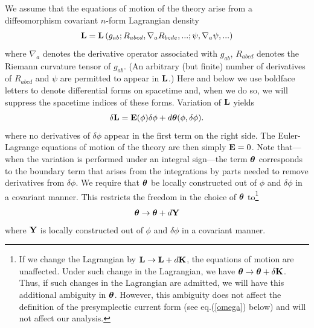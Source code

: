 We assume that the equations of motion of the theory arise from a
diffeomorphism covariant $n$-form Lagrangian density \cite{iw}
\begin{equation}
{\bf L} = {\bf L} \left( g_{ab}; R_{abcd}, \nabla_a R_{bcde},
...;\psi, \nabla_a \psi, ...\right)
\label{lag}
\end{equation}
where $\nabla_a$ denotes the derivative operator associated with
$g_{ab}$, $R_{abcd}$ denotes the Riemann curvature tensor of
$g_{ab}$. (An arbitrary (but finite) number of derivatives of
$R_{abcd}$ and $\psi$ are permitted to appear in ${\bf L}$.) Here and
below we use boldface letters to denote differential forms on
spacetime and, when we do so, we will suppress the spacetime indices
of these forms. Variation of ${\bf L}$ yields
\begin{equation}
\delta {\bf L} = {\bf E}(\phi) \delta \phi + d {\mbox{\boldmath
$\theta$}}(\phi, \delta \phi) .
\label{dL}
\end{equation}
where no derivatives of $\delta \phi$ appear in the first term on the
right side. The Euler-Lagrange equations of motion of the theory are
then simply ${\bf E} = 0$. Note that---when the variation is performed
under an integral sign---the term ${\mbox{\boldmath $\theta$}}$
corresponds to the boundary term that arises from the integrations by
parts needed to remove derivatives from $\delta \phi$. We require that
${\mbox{\boldmath $\theta$}}$ be locally constructed out of $\phi$ and
$\delta \phi$ in a covariant manner. This restricts the freedom in
the choice of ${\mbox{\boldmath $\theta$}}$ to\footnote{If we change
the Lagrangian by ${\bf L} \rightarrow {\bf L} + d {\bf K}$, the
equations of motion are unaffected. Under such change in the
Lagrangian, we have ${\mbox{\boldmath $\theta$}} \rightarrow
{\mbox{\boldmath $\theta$}} + \delta {\bf K}$. Thus, if such changes
in the Lagrangian are admitted, we will have this additional ambiguity
in ${\mbox{\boldmath $\theta$}}$. However, this ambiguity does not
affect the definition of the presymplectic current form (see
eq.(\ref{omega}) below) and will not affect our analysis.}
\begin{equation}
{\mbox{\boldmath $\theta$}} \rightarrow {\mbox{\boldmath $\theta$}} +
d {\bf Y}
\label{Y1}
\end{equation}
where ${\bf Y}$ is locally constructed out of $\phi$ and $\delta
\phi$ in a covariant manner. 

